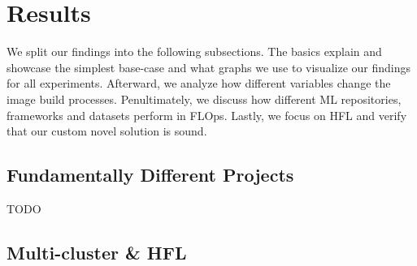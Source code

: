 \section{Results}

We split our findings into the following subsections.
The basics explain and showcase the simplest base-case and what graphs we use to visualize our findings for all experiments.
Afterward, we analyze how different variables change the image build processes.
Penultimately, we discuss how different ML repositories, frameworks and datasets perform in FLOps.
Lastly, we focus on HFL and verify that our custom novel solution is sound.





\subsection{Fundamentally Different Projects}
TODO


\subsection{Multi-cluster \& HFL}
